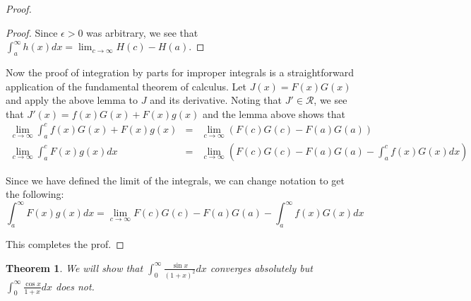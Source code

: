 \documentclass[psamsfonts]{amsart}
\newtheorem{thm}{Theorem}[section]
\theoremstyle{definition}
\theoremstyle{remark}
\numberwithin{equation}{section}
\begin{document}
\begin{proof}
\begin{proof}
Since $\epsilon > 0$ was arbitrary, we see that $\int_a^\infty h(x) dx = \lim_{c \to \infty} H(c) - H(a)$. 
\end{proof}

Now the proof of integration by parts for improper integrals is a straightforward application of the fundamental theorem of calculus. Let $J(x) = F(x)G(x)$ and apply the above lemma to $J$ and its derivative. Noting that $J' \in \mathscr{R}$, we see that $J'(x) = f(x)G(x) + F(x)g(x)$ and the lemma above shows that 
\begin{eqnarray}
\lim_{c \to \infty} \int_a^c f(x)G(x) + F(x)g(x) &=& \lim_{c \to \infty} \left( F(c)G(c) - F(a)G(a) \right) \\
\lim_{c \to \infty} \int_a^c F(x)g(x) dx &=& \lim_{c \to \infty} \left( F(c)G(c) - F(a)G(a) - \int_a^c f(x)G(x) dx \right)
\end{eqnarray}

Since we have defined the limit of the integrals, we can change notation to get the following:
\begin{equation}
\int_a^\infty F(x)g(x) dx = \lim_{c \to \infty} F(c)G(c) - F(a)G(a) - \int_a^\infty f(x)G(x) dx
\end{equation}

This completes the prof.
\end{proof}

\begin{thm}
We will show that $\int_0^\infty \frac{\sin x}{(1+x)^2} dx$ converges absolutely but $\int_0^\infty \frac{\cos x}{1 + x} dx$ does not.
\end{thm}
\end{document}
